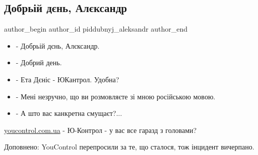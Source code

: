  
 
 
 
 
 
\subsection{Добрьій дєнь, Алєксандр}
\label{sec:02_08_2021.fb.piddubnyj_aleksandr.1.dobryj_den_aleksandr}
 
\ifcmt
 author_begin
   author_id piddubnyj_aleksandr
 author_end
\fi

\begin{itemize}
  \item - Добрьій дєнь, Алєксандр. 
  \item - Добрий день.
  \item - Ета Дєніс - ЮКантрол. Удобна?
  \item - Мені незручно, що ви розмовляєте зі мною російською мовою.
  \item - А што вас канкретна смущаєт?...
\end{itemize}

\url{youcontrol.com.ua} - Ю-Контрол - у вас все гаразд з головами?

Доповнено: YouControl перепросили за те, що сталося, тож інцидент вичерпано.

